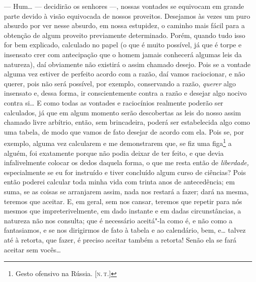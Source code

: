 --- Hum\ldots{} --- decidirão os senhores ---, nossas vontades se equivocam em
grande parte devido à visão equivocada de nossos proveitos. Desejamos às
vezes um puro absurdo por ver nesse absurdo, em nossa estupidez, o
caminho mais fácil para a obtenção de algum proveito previamente
determinado. Porém, quando tudo isso for bem explicado, calculado no
papel (o que é muito possível, já que é torpe e insensato crer com
antecipação que o homem jamais conhecerá algumas leis da natureza), daí
obviamente não existirá o assim chamado desejo. Pois se a vontade alguma
vez estiver de perfeito acordo com a razão, daí vamos raciocionar, e não
querer, pois não será possível, por exemplo, conservando a razão,
\emph{querer} algo insensato e, dessa forma, ir conscientemente contra a
razão e desejar algo nocivo contra si\ldots{} E como todas as vontades e
raciocínios realmente poderão ser calculados, já que em algum momento
serão descobertas as leis do nosso assim chamado livre arbítrio, então,
sem brincadeira, poderá ser estabelecida algo como uma tabela, de modo
que vamos de fato desejar de acordo com ela. Pois se, por exemplo,
alguma vez calcularem e me demonstrarem que, se fiz uma figa\footnote{Gesto
  ofensivo na Rússia. {[}\textsc{n.\,t.}{]}} a alguém, foi exatamente porque não
podia deixar de ter feito, e que devia infalivelmente colocar os dedos
daquela forma, o que me resta então de \emph{liberdade,} especialmente
se eu for instruído e tiver concluído algum curso de ciências? Pois
então poderei calcular toda minha vida com trinta anos de antecedência;
em suma, se as coisas se arranjarem assim, nada nos restará a fazer;
dará na mesma, teremos que aceitar. E, em geral, sem nos cansar, teremos
que repetir para nós mesmos que impreterivelmente, em dado instante e em
dadas circunstâncias, a natureza não nos consulta; que é necessário
aceitá"-la como é, e não como a fantasiamos, e se nos dirigirmos de fato
à tabela e ao calendário, bem, e\ldots{} talvez até à retorta, que fazer, é
preciso aceitar também a retorta! Senão ela se fará aceitar sem vocês\ldots{}

